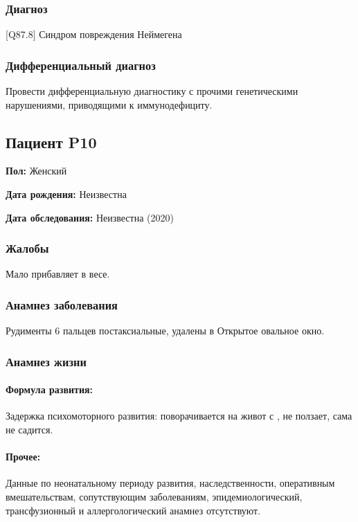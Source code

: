 \documentclass[a4paper,14pt]{extarticle}
\newcommand{\months}{мес.}
\newcommand{\DS}[2]{[#2] #1}
\begin{document}
\subsubsection*{Диагноз}

\DS{Синдром повреждения Неймегена}{Q87.8}

\subsubsection*{Дифференциальный диагноз}

Провести дифференциальную диагностику с прочими генетическими нарушениями, приводящими к иммунодефициту.

\newpage
\subsection*{Пациент P10}

\textbf{Пол:} Женский

\textbf{Дата рождения:} Неизвестна

\textbf{Дата обследования:} Неизвестна (2020)

\subsubsection*{Жалобы}

Мало прибавляет в весе.

\subsubsection*{Анамнез заболевания}

Рудименты 6 пальцев постаксиальные, удалены в \numprint[\months]{6}
Открытое овальное окно.

\subsubsection*{Анамнез жизни}

\paragraph{Формула развития:} Задержка психомоторного развития: поворачивается на живот с \numprint[\months]{6}, не ползает, сама не садится. 

\paragraph{Прочее:} Данные по неонатальному периоду развития, наследственности, оперативным вмешательствам, сопутствующим заболеваниям, эпидемиологический, трансфузионный и аллергологический анамнез отсутствуют.
\end{document}
